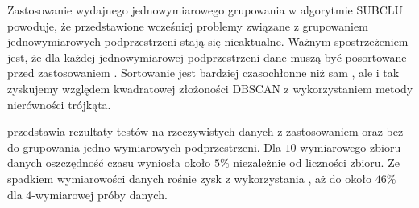 



Zastosowanie wydajnego jednowymiarowego grupowania w algorytmie SUBCLU powoduje, że przedstawione wcześniej problemy związane z grupowaniem jednowymiarowych podprzestrzeni stają się nieaktualne. Ważnym spostrzeżeniem jest, że dla każdej jednowymiarowej podprzestrzeni dane muszą być posortowane przed zastosowaniem . Sortowanie jest bardziej czasochłonne niż sam , ale i tak zyskujemy względem kwadratowej złożoności DBSCAN z wykorzystaniem metody nierówności trójkąta.\par
{} przedstawia rezultaty testów na rzeczywistych danych z zastosowaniem oraz bez  do grupowania jedno-wymiarowych podprzestrzeni. Dla $ 10 $-wymiarowego zbioru danych oszczędność czasu wyniosła około $ 5\% $ niezależnie od liczności zbioru. Ze spadkiem wymiarowości danych rośnie zysk z wykorzystania , aż do około $ 46\% $ dla $ 4 $-wymiarowej próby danych.